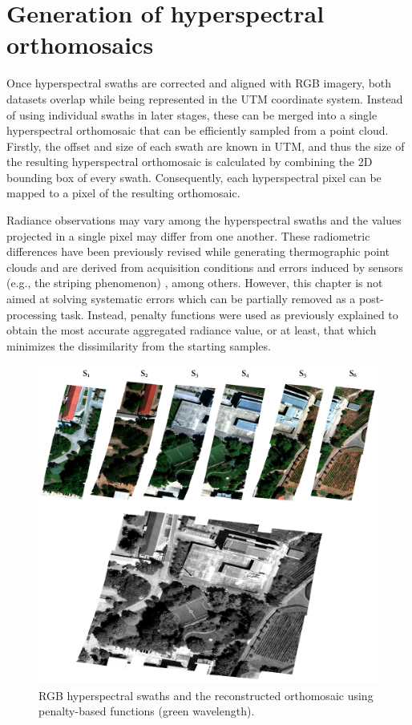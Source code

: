 \section{Generation of hyperspectral orthomosaics}

Once hyperspectral swaths are corrected and aligned with RGB imagery, both datasets overlap while being represented in the UTM coordinate system. Instead of using individual swaths in later stages, these can be merged into a single hyperspectral orthomosaic that can be efficiently sampled from a point cloud. Firstly, the offset and size of each swath are known in UTM, and thus the size of the resulting hyperspectral orthomosaic is calculated by combining the 2D bounding box of every swath. Consequently, each hyperspectral pixel can be mapped to a pixel of the resulting orthomosaic. 

Radiance observations may vary among the hyperspectral swaths and the values projected in a single pixel may differ from one another. These radiometric differences have been previously revised while generating thermographic point clouds and are derived from acquisition conditions and errors induced by sensors (e.g., the striping phenomenon) \cite{pu_hyperspectral_2017}, among others. However, this chapter is not aimed at solving systematic errors which can be partially removed as a post-processing task. Instead, penalty functions were used as previously explained to obtain the most accurate aggregated radiance value, or at least, that which minimizes the dissimilarity from the starting samples. 

\begin{figure}[bt]
    \centering
    \includegraphics[width=\linewidth]{figs/hyper_point_cloud/orthomosaic.png}
	\caption{RGB hyperspectral swaths and the reconstructed orthomosaic using penalty-based functions (green wavelength). }
	\label{fig:hyper_band_fusion}
\end{figure}

